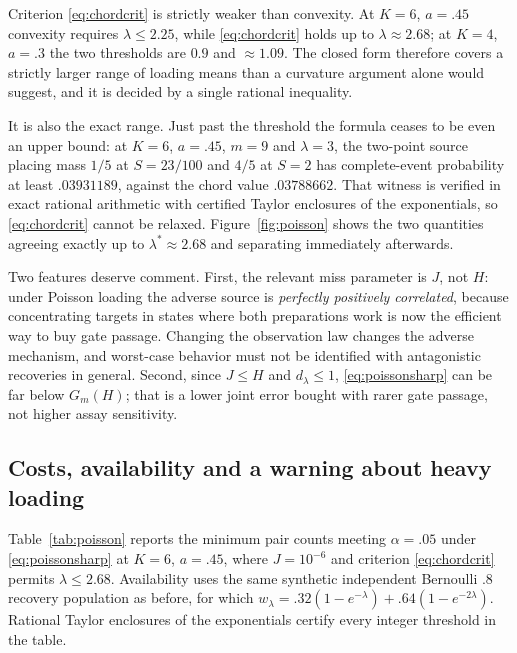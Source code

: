 \documentclass[11pt]{article}
\theoremstyle{remark}\newtheorem{remark}[theorem]{Remark}
\begin{document}
Criterion \eqref{eq:chordcrit} is strictly weaker than convexity. At $K=6$,
$a=.45$ convexity requires $\lambda\le2.25$, while \eqref{eq:chordcrit} holds up
to $\lambda\approx2.68$; at $K=4$, $a=.3$ the two thresholds are $0.9$ and
$\approx1.09$. The closed form therefore covers a strictly larger range of
loading means than a curvature argument alone would suggest, and it is decided by
a single rational inequality.

It is also the exact range. Just past the threshold the formula ceases to be
even an upper bound: at $K=6$, $a=.45$, $m=9$ and $\lambda=3$, the two-point
source placing mass $1/5$ at $S=23/100$ and $4/5$ at $S=2$ has complete-event
probability at least $.03931189$, against the chord value $.03788662$. That
witness is verified in exact rational arithmetic with certified Taylor
enclosures of the exponentials, so \eqref{eq:chordcrit} cannot be relaxed.
Figure~\ref{fig:poisson} shows the two quantities agreeing exactly up to
$\lambda^\ast\approx2.68$ and separating immediately afterwards.

Two features deserve comment. First, the relevant miss parameter is $J$, not $H$:
under Poisson loading the adverse source is \emph{perfectly positively
correlated}, because concentrating targets in states where both preparations
work is now the efficient way to buy gate passage. Changing the observation law
changes the adverse mechanism, and worst-case behavior must not be identified
with antagonistic recoveries in general. Second, since $J\le H$ and
$d_\lambda\le1$, \eqref{eq:poissonsharp} can be far below $G_m(H)$; that is a
lower joint error bought with rarer gate passage, not higher assay sensitivity.

\subsection{Costs, availability and a warning about heavy loading}
Table~\ref{tab:poisson} reports the minimum pair counts meeting $\alpha=.05$
under \eqref{eq:poissonsharp} at $K=6$, $a=.45$, where $J=10^{-6}$ and
criterion \eqref{eq:chordcrit} permits $\lambda\le2.68$. Availability uses the same synthetic
independent Bernoulli $.8$ recovery population as before, for which
$w_\lambda=.32(1-e^{-\lambda})+.64(1-e^{-2\lambda})$. Rational Taylor enclosures
of the exponentials certify every integer threshold in the table.
\end{document}

